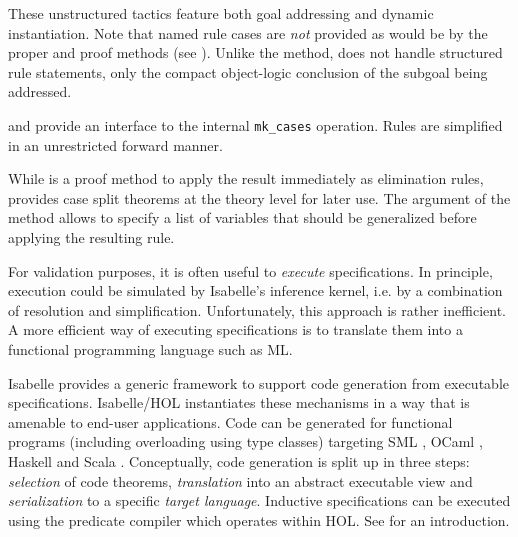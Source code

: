 \begin{isabellebody}
\begin{isamarkuptext}
\begin{description}
  These unstructured tactics feature both goal addressing and dynamic
  instantiation.  Note that named rule cases are \emph{not} provided
  as would be by the proper \hyperlink{method.cases}{\mbox{}} and \hyperlink{method.induct}{\mbox{}} proof
  methods (see ).  Unlike the \hyperlink{method.induct}{\mbox{}} method, \hyperlink{method.induct-tac}{\mbox{}} does not handle structured rule
  statements, only the compact object-logic conclusion of the subgoal
  being addressed.

  \item \hyperlink{method.HOL.ind-cases}{\mbox{}} and \hyperlink{command.HOL.inductive-cases}{\mbox{}} provide an interface to the internal \verb|mk_cases| operation.  Rules are simplified in an unrestricted
  forward manner.

  While \hyperlink{method.HOL.ind-cases}{\mbox{}} is a proof method to apply the
  result immediately as elimination rules, \hyperlink{command.HOL.inductive-cases}{\mbox{}} provides case split theorems at the theory level
  for later use.  The \hyperlink{keyword.for}{\mbox{}} argument of the \hyperlink{method.HOL.ind-cases}{\mbox{}} method allows to specify a list of variables that should
  be generalized before applying the resulting rule.

  \end{description}%
\end{isamarkuptext}%
\isamarkuptrue%
%
\isamarkuptrue%
%
\begin{isamarkuptext}%
For validation purposes, it is often useful to \emph{execute}
  specifications.  In principle, execution could be simulated by
  Isabelle's inference kernel, i.e. by a combination of resolution and
  simplification.  Unfortunately, this approach is rather inefficient.
  A more efficient way of executing specifications is to translate
  them into a functional programming language such as ML.

  Isabelle provides a generic framework to support code generation
  from executable specifications.  Isabelle/HOL instantiates these
  mechanisms in a way that is amenable to end-user applications.  Code
  can be generated for functional programs (including overloading
  using type classes) targeting SML \cite{SML}, OCaml \cite{OCaml},
  Haskell \cite{haskell-revised-report} and Scala
  \cite{scala-overview-tech-report}.  Conceptually, code generation is
  split up in three steps: \emph{selection} of code theorems,
  \emph{translation} into an abstract executable view and
  \emph{serialization} to a specific \emph{target language}.
  Inductive specifications can be executed using the predicate
  compiler which operates within HOL.  See \cite{isabelle-codegen} for
  an introduction.


\end{isamarkuptext}
\end{isabellebody}

